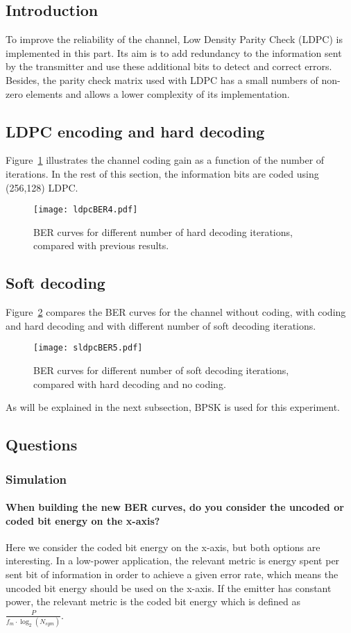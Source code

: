 \subsection{Introduction}
To improve the reliability of the channel, Low Density Parity Check (LDPC) is implemented in this part. Its aim is to add redundancy to the information sent by the transmitter and use these additional bits to detect and correct errors. Besides, the parity check matrix used with LDPC has a small numbers of non-zero elements and allows a lower complexity of its implementation.
\subsection{LDPC encoding and hard decoding}
Figure~\ref{fig:ldpcBER} illustrates the channel coding gain as a function of the number of iterations.
In the rest of this section, the information bits are coded using (256,128) LDPC.
\begin{figure}[htbp]
    \centering
    \texttt{[image: ldpcBER4.pdf]}
    \caption{BER curves for different number of hard decoding iterations, compared with previous results.\label{fig:ldpcBER}}
\end{figure}

\subsection{Soft decoding}
Figure~\ref{fig:sldpcBER} compares the BER curves for the channel without coding, with coding and hard decoding and with different number of soft decoding iterations.
\begin{figure}[htbp]
    \centering
    \texttt{[image: sldpcBER5.pdf]}
    \caption{BER curves for different number of soft decoding iterations, compared with hard decoding and no coding.\label{fig:sldpcBER}}
\end{figure}
As will be explained in the next subsection, BPSK is used for this experiment.

\subsection{Questions}
\subsubsection{Simulation}
\paragraph{When building the new BER curves, do you consider the uncoded or coded bit energy on the x-axis?}
Here we consider the coded bit energy on the x-axis, but both options are interesting.
In a low-power application, the relevant metric is energy spent per sent bit of information in order to achieve a given error rate, which means the uncoded bit energy should be used on the x-axis.
If the emitter has constant power, the relevant metric is the coded bit energy which is defined as $\frac{P}{f_m \cdot \log_2(N_{sym})}$.

